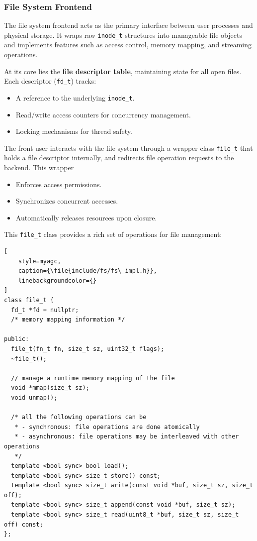 \subsubsection{File System Frontend}

The file system frontend acts as the primary interface between user processes and physical storage. It wraps raw \lstinline[style=myagc]|inode_t| structures into manageable file objects and implements features such as access control, memory mapping, and streaming operations.

At its core lies the \textbf{file descriptor table}, maintaining state for all open files. Each descriptor (\lstinline[style=myagc]|fd_t|) tracks:
\begin{itemize}
    \item A reference to the underlying \lstinline[style=myagc]|inode_t|.
    \item Read/write access counters for concurrency management.
    \item Locking mechanisms for thread safety.
\end{itemize}

The front user interacts with the file system through a wrapper class
\lstinline[style=myagc]|file_t| that holds a file descriptor internally, and redirects
file operation requests to the backend. This wrapper
\begin{itemize}
    \item Enforces access permissions.
    \item Synchronizes concurrent accesses.
    \item Automatically releases resources upon closure.
\end{itemize}

This \lstinline[style=myagc]|file_t| class provides a rich set of operations for file
management:

\begin{lstlisting}[
    style=myagc,
    caption={\file{include/fs/fs\_impl.h}},
    linebackgroundcolor={}
]
class file_t {
  fd_t *fd = nullptr;
  /* memory mapping information */

public:
  file_t(fn_t fn, size_t sz, uint32_t flags);
  ~file_t();

  // manage a runtime memory mapping of the file
  void *mmap(size_t sz);
  void unmap();

  /* all the following operations can be 
   * - synchronous: file operations are done atomically
   * - asynchronous: file operations may be interleaved with other operations
   */
  template <bool sync> bool load();
  template <bool sync> size_t store() const;
  template <bool sync> size_t write(const void *buf, size_t sz, size_t off);
  template <bool sync> size_t append(const void *buf, size_t sz);
  template <bool sync> size_t read(uint8_t *buf, size_t sz, size_t off) const;
};
\end{lstlisting}




